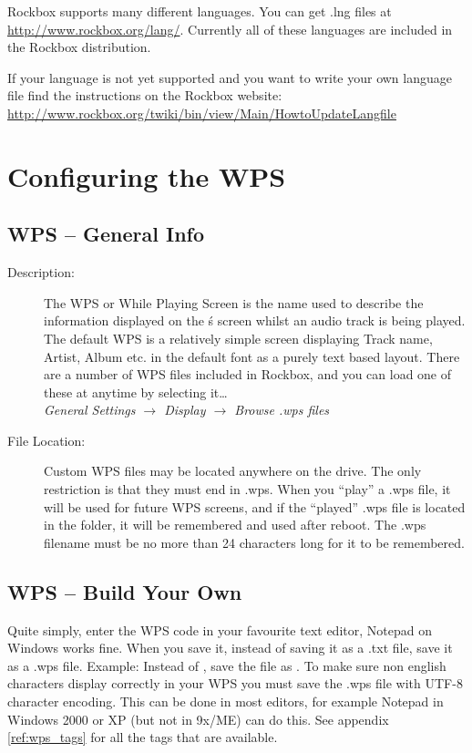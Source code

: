 Rockbox supports many different languages. You can get .lng files at
\url{http://www.rockbox.org/lang/}.
Currently all of these languages are included in the Rockbox distribution.

If your language is not yet supported and you want to write your own language
file find the instructions on the Rockbox website:
\url{http://www.rockbox.org/twiki/bin/view/Main/HowtoUpdateLangfile}

\section{\label{ref:ConfiguringtheWPS}Configuring the WPS}

\subsection{WPS -- General Info}

\begin{description}
\item[Description: ] The WPS or While Playing Screen is the name used to describe 
the information displayed on the \dap\'s screen whilst an audio track is
being played. The default WPS is a relatively simple screen displaying
Track name, Artist, Album etc. in the default font as a purely text based
layout. There are a number of WPS files included in Rockbox, and you can 
load one of these at anytime by selecting it\dots\\
\emph{General Settings $\rightarrow$ Display $\rightarrow$ Browse .wps files}\\


\item [File Location: ]Custom WPS files may be located anywhere on the drive. 
The only restriction is that they must end in .wps. When you ``play'' a .wps 
file, it will be used for future WPS screens, and if the ``played'' .wps file is 
located in the  folder, it will be remembered and used after 
reboot. The .wps filename must be no more than 24 characters long for it to be
remembered.
\end{description}

\subsection{\label{ref:CreateYourOwnWPS}WPS -- Build Your Own}
Quite simply, enter the WPS code in your favourite text editor, Notepad on
Windows works fine. When you save it, instead of saving it as a .txt file, save
it as a .wps file. Example: Instead of , save the file as
. To make sure non english characters display correctly in
your WPS you must save the .wps file with UTF-8 character encoding. This can be
done in most editors, for example Notepad in Windows 2000 or XP (but not in
9x/ME) can do this. See appendix \ref{ref:wps_tags} for all the tags that are
available.

